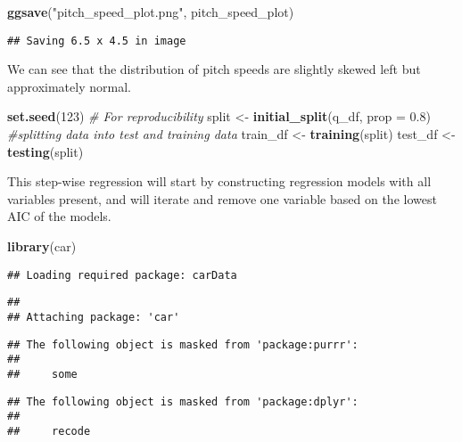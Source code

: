 \documentclass[
]{article}
\newenvironment{Shaded}{\begin{snugshade}}{\end{snugshade}}
\newcommand{\AttributeTok}[1]{\textcolor[rgb]{0.13,0.29,0.53}{#1}}
\newcommand{\CommentTok}[1]{\textcolor[rgb]{0.56,0.35,0.01}{\textit{#1}}}
\newcommand{\DecValTok}[1]{\textcolor[rgb]{0.00,0.00,0.81}{#1}}
\newcommand{\FloatTok}[1]{\textcolor[rgb]{0.00,0.00,0.81}{#1}}
\newcommand{\FunctionTok}[1]{\textcolor[rgb]{0.13,0.29,0.53}{\textbf{#1}}}
\newcommand{\NormalTok}[1]{#1}
\newcommand{\OtherTok}[1]{\textcolor[rgb]{0.56,0.35,0.01}{#1}}
\newcommand{\StringTok}[1]{\textcolor[rgb]{0.31,0.60,0.02}{#1}}
\begin{document}
\begin{Shaded}
\begin{Highlighting}[]
\FunctionTok{ggsave}\NormalTok{(}\StringTok{"pitch\_speed\_plot.png"}\NormalTok{, pitch\_speed\_plot)}
\end{Highlighting}
\end{Shaded}

\begin{verbatim}
## Saving 6.5 x 4.5 in image
\end{verbatim}

We can see that the distribution of pitch speeds are slightly skewed
left but approximately normal.

\begin{Shaded}
\begin{Highlighting}[]
\FunctionTok{set.seed}\NormalTok{(}\DecValTok{123}\NormalTok{)  }\CommentTok{\# For reproducibility}
\NormalTok{split }\OtherTok{\textless{}{-}} \FunctionTok{initial\_split}\NormalTok{(q\_df, }\AttributeTok{prop =} \FloatTok{0.8}\NormalTok{) }\CommentTok{\#splitting data into test and training data}
\NormalTok{train\_df }\OtherTok{\textless{}{-}} \FunctionTok{training}\NormalTok{(split)}
\NormalTok{test\_df }\OtherTok{\textless{}{-}} \FunctionTok{testing}\NormalTok{(split)}
\end{Highlighting}
\end{Shaded}

This step-wise regression will start by constructing regression models
with all variables present, and will iterate and remove one variable
based on the lowest AIC of the models.

\begin{Shaded}
\begin{Highlighting}[]
\FunctionTok{library}\NormalTok{(car)}
\end{Highlighting}
\end{Shaded}

\begin{verbatim}
## Loading required package: carData
\end{verbatim}

\begin{verbatim}
## 
## Attaching package: 'car'
\end{verbatim}

\begin{verbatim}
## The following object is masked from 'package:purrr':
## 
##     some
\end{verbatim}

\begin{verbatim}
## The following object is masked from 'package:dplyr':
## 
##     recode
\end{verbatim}
\end{document}
